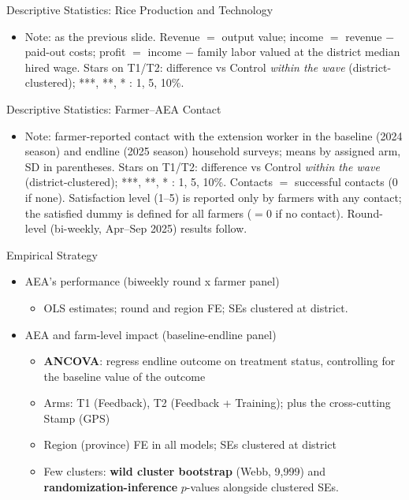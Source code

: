 \documentclass[aspectratio=169]{beamer}
\newcommand{\notefont}{\fontsize{5pt}{6pt}\selectfont}
\begin{document}
\begin{frame}{Descriptive Statistics: Rice Production and Technology}
	\centering
	\begin{itemize}\notefont
		\item Note: as the previous slide. Revenue $=$ output value; income $=$ revenue $-$
		paid-out costs; profit $=$ income $-$ family labor valued at the district median hired
		wage. Stars on T1/T2: difference vs Control \emph{within the wave} (district-clustered);
		***, **, * : 1, 5, 10\%.
	\end{itemize}
\end{frame}

\begin{frame}{Descriptive Statistics: Farmer--AEA Contact}
	\centering
	\begin{itemize}\notefont
		\item Note: farmer-reported contact with the extension worker in the baseline (2024
		season) and endline (2025 season) household surveys; means by assigned arm, SD in
		parentheses. Stars on T1/T2: difference vs Control \emph{within the wave}
		(district-clustered); ***, **, * : 1, 5, 10\%. Contacts $=$ successful contacts
		($0$ if none). Satisfaction level (1--5) is reported only by farmers with any
		contact; the satisfied dummy is defined for all farmers ($=0$ if no contact).
		Round-level (bi-weekly, Apr--Sep 2025) results follow.
	\end{itemize}
\end{frame}

\begin{frame}{Empirical Strategy}
    \begin{itemize}
    \item AEA's performance (biweekly round x farmer panel)
    \begin{itemize}
        \item OLS estimates; round and region FE; SEs clustered at district.
    \end{itemize}
			\vspace{0.3cm}
    \item AEA and farm-level impact (baseline-endline panel)
    \begin{itemize}
    	\item \textbf{ANCOVA}: regress endline outcome on treatment status, controlling for the baseline value of the outcome
	    \item Arms: T1 (Feedback), T2 (Feedback + Training); plus the cross-cutting Stamp (GPS)
	   \item Region (province) FE in all models; SEs clustered at district
       \item Few clusters: \textbf{wild cluster bootstrap} (Webb, 9{,}999) and \textbf{randomization-inference} $p$-values alongside clustered SEs.
    \end{itemize}
\end{itemize}


\end{frame}
\end{document}
